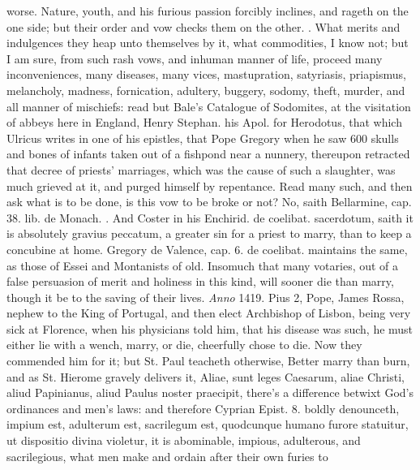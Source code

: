 worse. Nature, youth, and his furious passion forcibly inclines, and
rageth on the one side; but their order and vow checks them on the
other. . What merits and
indulgences they heap unto themselves by it, what commodities, I know
not; but I am sure, from such rash vows, and inhuman manner of life,
proceed many inconveniences, many diseases, many vices, mastupration,
satyriasis, priapismus, melancholy, madness, fornication,
adultery, buggery, sodomy, theft, murder, and all manner of mischiefs:
read but Bale's Catalogue of Sodomites, at the visitation of abbeys
here in England, Henry Stephan. his Apol. for Herodotus, that which
Ulricus writes in one of his epistles, that Pope Gregory when he
saw 600 skulls and bones of infants taken out of a fishpond near a
nunnery, thereupon retracted that decree of priests' marriages, which
was the cause of such a slaughter, was much grieved at it, and purged
himself by repentance. Read many such, and then ask what is to be done,
is this vow to be broke or not? No, saith Bellarmine, \textlatin{cap. 38. lib.
de Monach.} . And Coster in his
\textlatin{Enchirid. de coelibat. sacerdotum}, saith it is absolutely gravius
peccatum, a greater sin for a priest to marry, than to
keep a concubine at home. Gregory de Valence, cap. 6. de coelibat. maintains
the same, as those of Essei and Montanists of old. Insomuch that many
votaries, out of a false persuasion of merit and holiness in this kind,
will sooner die than marry, though it be to the saving of their lives.
\emph{Anno} 1419. Pius 2, Pope, James Rossa, nephew to the King of
Portugal, and then elect Archbishop of Lisbon, being very sick at
Florence, when his physicians told him, that his disease was
such, he must either lie with a wench, marry, or die, cheerfully chose
to die. Now they commended him for it; but St. Paul teacheth otherwise,
Better marry than burn, and as St. Hierome gravely delivers it, Aliae,
sunt leges Caesarum, aliae Christi, aliud Papinianus, aliud Paulus
noster praecipit, there's a difference betwixt God's ordinances and
men's laws: and therefore Cyprian Epist. 8. boldly denounceth, impium
est, adulterum est, sacrilegum est, quodcunque humano furore statuitur,
ut dispositio divina violetur, it is abominable, impious, adulterous,
and sacrilegious, what men make and ordain after their own furies to
